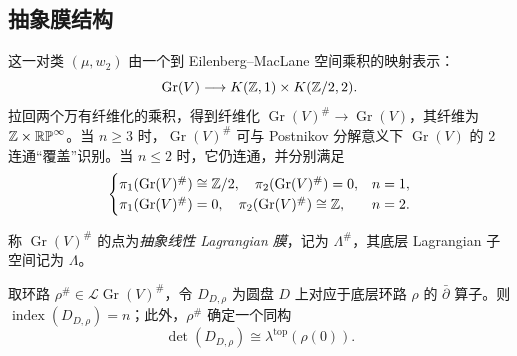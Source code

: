 \subsection{抽象膜结构}\label{sec:11h}
这一对类 $(\mu,\allowbreak w_2)$ 由一个到 Eilenberg–MacLane 空间乘积的映射表示：
\begin{equation}\label{eq:11.22}
\operatorname{Gr}(V)\longrightarrow K(\mathbb Z,1)\times K(\mathbb Z/2,2).
\end{equation}
拉回两个万有纤维化的乘积，得到纤维化 $\operatorname{Gr}(V)^\#\to\operatorname{Gr}(V)$，其纤维为 $\mathbb Z\times\mathbb{RP}^\infty$。当 $n\geq3$ 时，$\operatorname{Gr}(V)^\#$ 可与 Postnikov 分解意义下 $\operatorname{Gr}(V)$ 的 $2$ 连通“覆盖”识别。当 $n\leq2$ 时，它仍连通，并分别满足
\begin{equation}\label{eq:11.23}
\begin{cases}
\pi_1(\operatorname{Gr}(V)^\#)\cong\mathbb Z/2,\quad\pi_2(\operatorname{Gr}(V)^\#)=0,&n=1,\\
\pi_1(\operatorname{Gr}(V)^\#)=0,\quad\pi_2(\operatorname{Gr}(V)^\#)\cong\mathbb Z,&n=2.
\end{cases}
\end{equation}
\begin{definition*}
称 $\operatorname{Gr}(V)^\#$ 的点为\emph{抽象线性 Lagrangian 膜}，记为 $\Lambda^\#$，其底层 Lagrangian 子空间记为 $\Lambda$。
\end{definition*}
\begin{lemma}\label{st:11.12}
取环路 $\rho^\#\in\mathcal L\operatorname{Gr}(V)^\#$，令 $D_{D,\allowbreak \rho}$ 为圆盘 $D$ 上对应于底层环路 $\rho$ 的 $\bar\partial$ 算子。则 $\operatorname{index}(D_{D,\allowbreak \rho})=n$；此外，$\rho^\#$ 确定一个同构
\[
\det(D_{D,\rho})\cong\lambda^{\mathrm{top}}(\rho(0)).
\]
\end{lemma}
